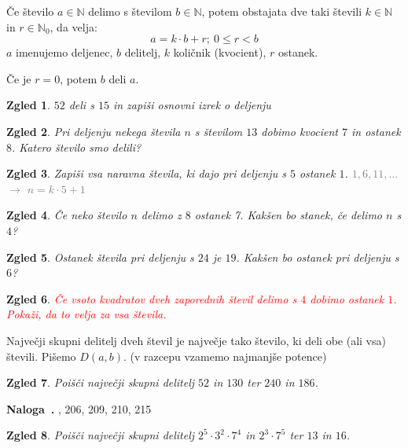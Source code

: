 \documentclass{article}
\newcounter{example}[section]
\newenvironment{example}[1][]{\refstepcounter{example}\par\medskip
   \noindent \textbf{Naloga~\theexample. #1} \rmfamily}{\medskip}
\newtheorem*{zgled}{Zgled}
\begin{document}
Če število $a\in\mathbb{N}$ delimo s številom $b\in\mathbb{N}$, potem obstajata dve taki števili $k\in\mathbb{N}$ in $r\in\mathbb{N}_0$, da velja:
\[a=k\cdot b +r; \ 0\leq r<b\]
$a$ imenujemo deljenec, $b$ delitelj, $k$ količnik (kvocient), $r$ ostanek.

Če je $r=0$, potem $b$ deli $a$.

\begin{zgled}
    $52$ deli s $15$ in zapiši osnovni izrek o deljenju
\end{zgled}

\begin{zgled}
    Pri deljenju nekega števila $n$ s številom $13$ dobimo kvocient $7$ in ostanek $8$. Katero število smo delili?
\end{zgled}

\begin{zgled}
    Zapiši vsa naravna števila, ki dajo pri deljenju s $5$ ostanek $1$. \textcolor{gray}{$1,6,11, \ldots$ $\rightarrow$ $n=k\cdot 5 +1$}
\end{zgled}

\begin{zgled}
    Če neko število $n$ delimo z $8$ ostanek 7. Kakšen bo stanek, če delimo $n$ s $4$?
\end{zgled}

\begin{zgled}
    Ostanek števila pri deljenju s $24$ je $19$. Kakšen bo ostanek pri deljenju s $6$?
\end{zgled}

\begin{zgled}
    \textcolor{red}{Če vsoto kvadratov dveh zaporednih števil delimo s $4$ dobimo ostanek $1$. Pokaži, da to velja za vsa števila.}
\end{zgled}

Največji skupni delitelj dveh števil je največje tako število, ki deli obe (ali vsa) števili. Pišemo $D\left(a,b\right)$. (v razcepu vzamemo najmanjše potence)

\begin{zgled}
    Poišči največji skupni delitelj $52$ in $130$ ter $240$ in $186$.
\end{zgled}

\begin{example}
    203, 206, 209, 210, 215
\end{example}

\begin{zgled}
    Poišči največji skupni delitelj $2^5\cdot 3^2\cdot 7^4$ in $2^3\cdot 7^5$ ter $13$ in $16$.
\end{zgled}
\end{document}
